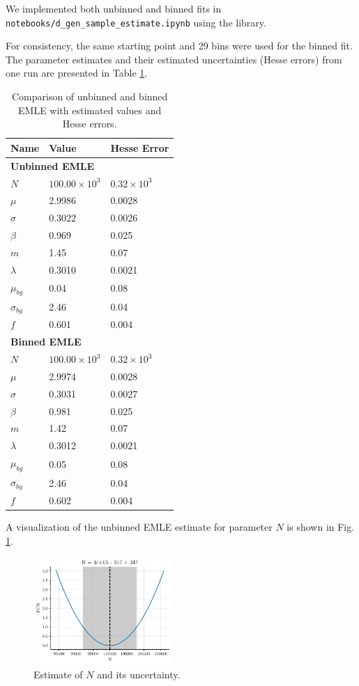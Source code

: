 \documentclass{article}
\begin{document}
We implemented both unbinned and binned fits in \texttt{notebooks/d\_gen\_sample\_estimate.ipynb} using the  library\cite{iminuit}. 

For consistency, the same starting point and 29 bins were used for the binned fit. The parameter estimates and their estimated uncertainties (Hesse errors) from one run are presented in Table \ref{tab:fit}.

\begin{longtable}{lll}
\caption{Comparison of unbinned and binned EMLE with estimated values and Hesse errors.} \label{tab:fit}\\
\toprule
\textbf{Name} & \textbf{Value} & \textbf{Hesse Error} \\
\midrule
\multicolumn{3}{l}{\textbf{Unbinned EMLE}} \\
$N$ & $100.00\times10^3$ & $0.32\times10^3$ \\
$\mu$ & 2.9986 & 0.0028 \\
$\sigma$ & 0.3022 & 0.0026 \\
$\beta$ & 0.969 & 0.025 \\
$m$ & 1.45 & 0.07 \\
$\lambda$ & 0.3010 & 0.0021 \\
$\mu_{bg}$ & 0.04 & 0.08 \\
$\sigma_{bg}$ & 2.46 & 0.04 \\
$f$ & 0.601 & 0.004 \\
\midrule
\multicolumn{3}{l}{\textbf{Binned EMLE}} \\
$N$ & $100.00\times10^3$ & $0.32\times10^3$ \\
$\mu$ & 2.9974 & 0.0028 \\
$\sigma$ & 0.3031 & 0.0027 \\
$\beta$ & 0.981 & 0.025 \\
$m$ & 1.42 & 0.07 \\
$\lambda$ & 0.3012 & 0.0021 \\
$\mu_{bg}$ & 0.05 & 0.08 \\
$\sigma_{bg}$ & 2.46 & 0.04 \\
$f$ & 0.602 & 0.004 \\
\bottomrule
\end{longtable}

A visualization of the unbinned EMLE estimate for parameter $N$ is shown in Fig. \ref{fig:profile_N}.

\begin{figure}[!t]
\centering
\includegraphics[width=0.47\textwidth]{./images/profile/N_profile.pdf}
\caption{Estimate of $N$ and its uncertainty.}
\label{fig:profile_N}
\end{figure}
\end{document}
